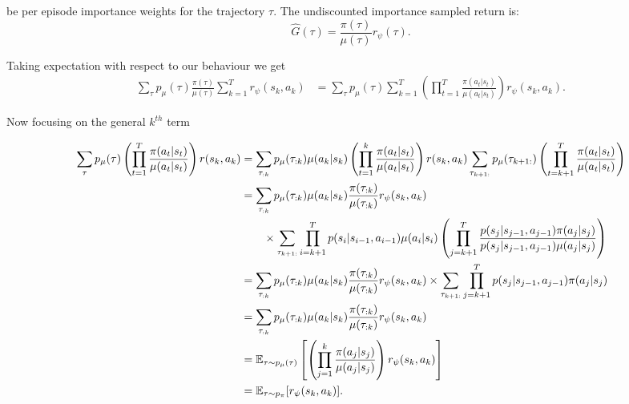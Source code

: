 \documentclass{report}
\numberwithin{equation}{section}
\numberwithin{figure}{section}
\numberwithin{table}{section}
\numberwithin{algorithm}{section}
\begin{document}
be per episode 
importance weights for the trajectory $\tau$. The 
undiscounted importance sampled return is:
\begin{equation*}
  \hat{G}(\tau)=\frac{\pi(\tau)}{\mu(\tau)}r_\psi(\tau).
\end{equation*}

Taking expectation with respect to our behaviour we get
\begin{align*}
  \sum_{\tau}p_\mu(\tau)\frac{\pi(\tau)}{\mu(\tau)}\sum_{k=1}^Tr_\psi(s_k,a_k)
  &=\sum_{\tau}p_\mu(\tau)\sum_{k=1}^T\left(
    \prod_{t=1}^T \frac{\pi(a_t|s_t)}{\mu(a_t|s_t)}
  \right)r_\psi(s_k,a_k).
\end{align*}

Now focusing on the general $k^{th}$ term

\begin{align*}
  \sum_{\tau}p_\mu(\tau)\left(
    \prod_{t=1}^T \frac{\pi(a_t|s_t)}{\mu(a_t|s_t)}
  \right)r(s_k,a_k)
  &=\sum_{\tau_{:k}}p_\mu(\tau_{:k})\mu(a_k|s_k)\left(
    \prod_{t=1}^k \frac{\pi(a_t|s_t)}{\mu(a_t|s_t)}
  \right)r(s_k,a_k)\sum_{\tau_{k+1:}}p_\mu(\tau_{k+1:})\left(
    \prod_{t=k+1}^T \frac{\pi(a_t|s_t)}{\mu(a_t|s_t)}
  \right)\notag\\
  &=\sum_{\tau_{:k}}p_\mu(\tau_{:k})\mu(a_k|s_k)
    \frac{\pi(\tau_{:k})}{
      \mu(\tau_{:k})
      }
  r_\psi(s_k,a_k)\notag\\
  &\qquad\times\sum_{\tau_{k+1:}}
    \prod_{i=k+1}^{T}p(s_{i}|s_{i-1},a_{i-1})\mu(a_i|s_i)\left(
    \prod_{j=k+1}^T\frac{
      p(s_{j}|s_{j-1},a_{j-1})\pi(a_j|s_j)}{
      p(s_{j}|s_{j-1},a_{j-1})\mu(a_j|s_j)
      }
  \right)\notag\\
  &=\sum_{\tau_{:k}}p_\mu(\tau_{:k})\mu(a_k|s_k)
    \frac{\pi(\tau_{:k})}{
      \mu(\tau_{:k})
      }
  r_\psi(s_k,a_k)\times\sum_{\tau_{k+1:}}\prod_{j=k+1}^T
      p(s_{j}|s_{j-1},a_{j-1})\pi(a_j|s_j)\notag\\
  &=\sum_{\tau_{:k}}p_\mu(\tau_{:k})\mu(a_k|s_k)
    \frac{\pi(\tau_{:k})}{
      \mu(\tau_{:k})
      }
  r_\psi(s_k,a_k)\notag\\
  &=\mathbb{E}_{\tau\sim p_\mu(\tau)}\left[\left(
    \prod_{j=1}^k\frac{\pi(a_j|s_j)}{\mu(a_j|s_j)}
  \right)r_\psi(s_k,a_k)\right]\notag\\
  &=\mathbb{E}_{\tau\sim p_\pi}[r_\psi(s_k,a_k)].
\end{align*}
\end{document}
